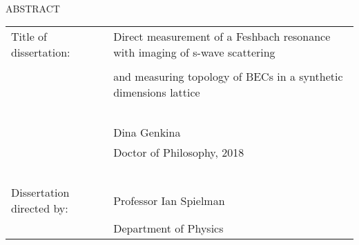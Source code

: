 
\hbox{\ }

\renewcommand{\baselinestretch}{1}
\small \normalsize

\begin{center}
\large{{ABSTRACT}}

\vspace{3em}

\end{center}
\hspace{-.15in}
\begin{tabular}{ll}
Title of dissertation:    & {\large  Direct measurement of a Feshbach resonance with imaging of s-wave scattering}\\
&                     {\large  } \\
&                     {\large and measuring topology of BECs in a synthetic dimensions lattice} \\
\ \\
&                          {\large  Dina Genkina} \\
&                           {\large Doctor of Philosophy, 2018} \\
\ \\
Dissertation directed by: & {\large  Professor Ian Spielman} \\
&               {\large  Department of Physics } \\
\end{tabular}

\vspace{3em}

\renewcommand{\baselinestretch}{2}
\large \normalsize


